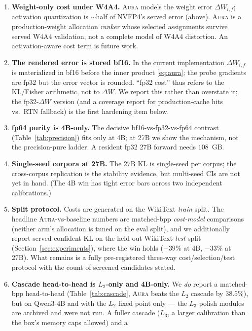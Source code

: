 \documentclass[11pt]{article}
\theoremstyle{plain}
\theoremstyle{definition}
\newcommand{\dW}{\Delta W}
\begin{document}
\begin{enumerate}[leftmargin=*,itemsep=3pt]
  \item \textbf{Weight-only cost under W4A4.} \textsc{Aura} models the weight
    error $\dW_{i,f}$; activation quantization is $\sim$half of NVFP4's served
    error (above). \textsc{Aura} is a production-weight allocation \emph{ranker}
    whose selected assignments survive served W4A4 validation, not a complete
    model of W4A4 distortion. An activation-aware cost term is future work.
  \item \textbf{The rendered error is stored bf16.} In the current
    implementation $\dW_{i,f}$ is materialized in bf16 before the inner product
    \eqref{eq:aura}; the probe gradients are fp32 but the error vector is
    rounded. ``fp32 cost'' thus refers to the KL/Fisher arithmetic, not to
    $\dW$. We report this rather than overstate it; the fp32-$\dW$ version (and a
    coverage report for production-cache hits vs.\ RTN fallback) is the first
    hardening item below.
  \item \textbf{fp64 purity is 4B-only.} The decisive bf16-vs-fp32-vs-fp64
    contrast (Table~\ref{tab:precision}) fits only at 4B; at 27B we show the
    mechanism, not the precision-pure ladder. A resident fp32 27B forward needs
    $108$~GB.
  \item \textbf{Single-seed corpora at 27B.} The 27B KL is single-seed per
    corpus; the cross-corpus replication is the stability evidence, but
    multi-seed CIs are not yet in hand. (The 4B win has tight error bars across
    two independent calibrations.)
  \item \textbf{Split protocol.} Costs are generated on the WikiText \emph{train}
    split. The headline \textsc{Aura}-vs-baseline numbers are matched-bpp
    \emph{cost-model} comparisons (neither arm's allocation is tuned on the eval
    split), and we additionally report served confident-KL on the held-out
    WikiText \emph{test} split (Section~\ref{sec:experiments}), where the win holds
    ($-39\%$ at 4B, $-33\%$ at 27B). What remains is a fully pre-registered
    three-way cost/selection/test protocol with the count of screened candidates
    stated.
  \item \textbf{Cascade head-to-head is $L_2$-only and 4B-only.} We \emph{do}
    report a matched-bpp head-to-head (Table~\ref{tab:cascade}, \textsc{Aura} beats
    the $L_2$ cascade by $38.5\%$), but on Qwen3-4B and with the $L_2$ fixed point
    only --- the $L_3$ polish modules are archived and were not run. A fuller
    cascade ($L_3$, a larger calibration than the box's memory caps allowed) and a

\end{enumerate}
\end{document}
